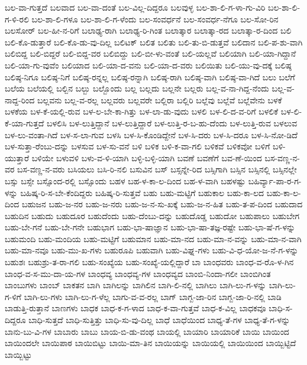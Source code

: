 {ಬಲ-ವಾ-ಗುತ್ತದೆ
ಬಲವಾದ
ಬಲ-ವಾ-ದಂತೆ
ಬಲ-ವಿಲ್ಲ-ದಿದ್ದರೂ
ಬಲವುಳ್ಳ
ಬಲ-ಶಾ-ಲಿ-ಗ-ಳಾ-ಗು-ವಿರಿ
ಬಲ-ಶಾ-ಲಿ-ಗ-ಳಿ-ರಲಿ
ಬಲ-ಶಾ-ಲಿ-ಗಳೂ
ಬಲ-ಶಾ-ಲಿ-ಗ-ಳೆಂದು
ಬಲ-ಸಂವರ್ಧನೆ
ಬಲ-ಸಂವರ್ಧ-ನೆಗೂ
ಬಲ-ಸೋ-ರಿನ
ಬಲಸೋರ್
ಬಲ-ಹೀ-ನ-ರಿಗೆ
ಬಲಾಢ್ಯ-ರಾಗಿ
ಬಲಾಢ್ಯ-ರಿ-ಗಿಂತ
ಬಲಾತ್ಕಾರ
ಬಲಾತ್ಕಾ-ರದ
ಬಲಾತ್ಕಾ-ರ-ದಿಂದ
ಬಲಿ
ಬಲಿ-ಕೊ-ಡುತ್ತಾರೆ
ಬಲಿ-ಕೊ-ಡು-ವು-ದಿಲ್ಲ
ಬಲಿಟಕ್
ಬಲಿತ
ಬಲಿತು
ಬಲಿ-ತು-ಬಿ-ಡುತ್ತವೆ
ಬಲಿದಾನ
ಬಲಿ-ಪ-ಶು-ವಾಗಿ
ಬಲಿಬಿದ್ದ
ಬಲಿ-ಬಿದ್ದರೆ
ಬಲಿ-ಬಿದ್ದ-ವರ
ಬಲಿಬಿದ್ದು
ಬಲಿ-ಬೀ-ಳು-ವಂತೆ
ಬಲಿ-ಯಲ್ಲವೆ
ಬಲಿಯಾಗಿ
ಬಲಿ-ಯಾ-ಗಿದ್ದಾನೆ
ಬಲಿ-ಯಾ-ಗು-ವುವೆಂ
ಬಲಿಯಾದ
ಬಲಿ-ಯಾ-ದ-ವನು
ಬಲಿ-ಯಾ-ದ-ವರು
ಬಲಿಯಿತು
ಬಲಿ-ಯು-ವು-ದಕ್ಕೆ
ಬಲಿಷ್ಠ
ಬಲಿಷ್ಠ-ನಿಗೂ
ಬಲಿಷ್ಠ-ನಿಗೆ
ಬಲಿಷ್ಠ-ರನ್ನಲ್ಲ
ಬಲಿಷ್ಠ-ರನ್ನಾಗಿ
ಬಲಿಷ್ಠ-ರಾಗಿ
ಬಲಿಷ್ಠ-ವಾಗಿ
ಬಲಿಷ್ಠ-ವಾ-ಗಿದೆ
ಬಲು
ಬಲೆಗೆ
ಬಲೆಯ
ಬಲೆಯಲ್ಲಿ
ಬಲ್ಬಿನ
ಬಲ್ಬು
ಬಲ್ಬೊಂದು
ಬಲ್ಲ
ಬಲ್ಲದು
ಬಲ್ಲನೇ
ಬಲ್ಲರು
ಬಲ್ಲ-ವ-ನಾ-ಗಿದ್ದ-ನೆಂದು
ಬಲ್ಲ-ವ-ನಾದ್ದ-ರಿಂದ
ಬಲ್ಲವನು
ಬಲ್ಲ-ವ-ರಲ್ಲ
ಬಲ್ಲವರು
ಬಲ್ಲವರೇ
ಬಲ್ಲಿರಾ
ಬಲ್ಲಿರಿ
ಬಲ್ಲೆವು
ಬಲ್ಲೆವೆ
ಬಲ್ಲೆವೇನು
ಬಳಕೆ
ಬಳಕೆಯ
ಬಳ-ಕೆ-ಯಲ್ಲಿ-ರುವ
ಬಳ-ಲ-ಬೇ-ಕಾ-ಗಿತ್ತು
ಬಳ-ಲಾ-ಡು-ವುದು
ಬಳಲಿ
ಬಳ-ಲಿ-ದ-ವ-ರಿಗೆ
ಬಳಲಿಕೆ
ಬಳ-ಲಿ-ಕೆ-ಯಾ-ಗುತ್ತದೆ
ಬಳಲಿಸಿ
ಬಳ-ಲುತ್ತಿದ್ದಾನೆ
ಬಳ-ಲುತ್ತಿದ್ದಾರೆ
ಬಳ-ಲುತ್ತಿ-ರ-ಬ-ಹು-ದೆಂದು
ಬಳ-ಲುತ್ತಿ-ರುವ
ಬಳಲುವ
ಬಳ-ಲು-ವಂತಾ-ಗಿದೆ
ಬಳ-ಸ-ಲಾ-ಗುವ
ಬಳಸಿ
ಬಳ-ಸಿ-ಕೊಂಡಿದ್ದೇನೆ
ಬಳ-ಸಿ-ದರು
ಬಳ-ಸಿ-ದರೂ
ಬಳ-ಸಿ-ನೋ-ಡಿದೆ
ಬಳ-ಸುತ್ತಾ-ರೆಂಬು-ದನ್ನು
ಬಳಸುವ
ಬಳ-ಸು-ವನೆ
ಬಳಿ
ಬಳಿಕ
ಬಳಿ-ಕ-ವಾ-ಗಲಿ
ಬಳಿಕವೆ
ಬಳಿಕವೋ
ಬಳಿಗೆ
ಬಳಿ-ಯುತ್ತಾರೆ
ಬಳಿಯೇ
ಬಳುವಳಿ
ಬಳು-ವ-ಳಿ-ಯಾಗಿ
ಬಳ್ಳಿ-ಬಳ್ಳಿ-ಯಾಗಿ
ಬವಣೆ
ಬವಣೆಗೆ
ಬವ-ಣೆ-ಯಿಂದ
ಬಸ-ವಣ್ಣ-ನ-ವರ
ಬಸ-ವಣ್ಣ-ನ-ವರು
ಬಸಿಯಲು
ಬಸಿ-ರಿ-ನಲಿ
ಬಸುವಿನ
ಬಸ್
ಬಸ್ಸನ್ನೇ-ರಿದ
ಬಸ್ಸಿಗಾಗಿ
ಬಸ್ಸಿನ
ಬಸ್ಸಿನಲ್ಲಿ
ಬಸ್ಸಿನಲ್ಲೇ
ಬಸ್ಸು
ಬಸ್ಸೇ
ಬಸ್ಸೊಂದ-ರಲ್ಲಿ
ಬಸ್ಸೊಂದು
ಬಹಳ
ಬಹ-ಳ-ಕಾ-ಲ-ದಿಂದ
ಬಹ-ಳ-ವಾಗಿ
ಬಹಳಷ್ಟು
ಬಹಿರ್ವ್ಯಾ-ಪಾ-ರ-ಗ-ಳನ್ನು
ಬಹಿಷ್ಕ-ರಿ-ಸ-ಬೇ-ಕೆಂದಿದ್ದರು
ಬಹಿಷ್ಕ-ರಿ-ಸುತ್ತವೆ
ಬಹು
ಬಹು-ಮಟ್ಟಿಗೆ
ಬಹುಕಾಲ
ಬಹು-ಕಾ-ಲದ
ಬಹು-ಕಾ-ಲ-ದಿಂದ
ಬಹುಜನ
ಬಹು-ಜ-ನರ
ಬಹು-ಜ-ನರು
ಬಹು-ಜ-ನ-ಸು-ಖಕ್ಕೆ
ಬಹು-ಜ-ನ-ಹಿತ
ಬಹು-ತ-ಪ-ದಿಂದ
ಬಹುದಾದ
ಬಹುದಿನ
ಬಹುದು
ಬಹುದೂರ
ಬಹುದೆಂದು
ಬಹು-ದೆಂಬು-ದನ್ನು
ಬಹುದೊಡ್ಡ
ಬಹುದೋ
ಬಹುಪಾಲು
ಬಹುಬೇಗ
ಬಹು-ಬೇ-ಗನೆ
ಬಹು-ಬೇ-ಗನೇ
ಬಹುಭಾಗ
ಬಹು-ಭಾ-ಷಾಜ್ಞಾನ
ಬಹು-ಭಾ-ಷಾ-ತಜ್ಞ-ರಷ್ಟೇ
ಬಹು-ಭಾ-ಷೆ-ಗ-ಳನ್ನು
ಬಹುಮಂದಿ
ಬಹು-ಮಂದಿಯ
ಬಹು-ಮಟ್ಟಿಗೆ
ಬಹುಮಾನ
ಬಹು-ಮಾ-ನದ
ಬಹು-ಮಾ-ನ-ವನ್ನು
ಬಹು-ಮಾ-ನ-ವಾಗಿ
ಬಹು-ಮಾ-ನವೂ
ಬಹು-ಮು-ಖ-ಗಳು
ಬಹುರೂಪಿ
ಬಹುವಾಗಿ
ಬಹು-ವಿಘ್ನ-ಗಳು
ಬಹು-ವಿ-ಧ-ಯೋ-ಜ-ನೆ-ಗ-ಳನ್ನು
ಬಹುಶಃ
ಬಹುಶ್ರು-ತ-ರಾ-ಗಲಿ
ಬಹು-ಸಂಖ್ಯೆಯ
ಬಹು-ಸಂಖ್ಯೆ-ಯಲ್ಲಿದ್ದಾರೆ
ಬಾ
ಬಾಂಧವರು
ಬಾಂಧ-ವ-ರೊ-ಳ-ಗಿನ
ಬಾಂಧ-ವ-ಸ-ಮು-ದಾ-ಯ-ಗಳ
ಬಾಂಧವ್ಯ
ಬಾಂಧವ್ಯ-ಗಳ
ಬಾಂಧವ್ಯದ
ಬಾಂಬಿ-ನಿಂದಾ-ಗಲೀ
ಬಾಂಬಿಗಿಂತ
ಬಾಂಬುಗಳು
ಬಾಂಬ್
ಬಾಕತನ
ಬಾಗಿ
ಬಾಗಿಲನ್ನು
ಬಾಗಿಲಿನ
ಬಾಗಿ-ಲಿ-ನಲ್ಲಿ
ಬಾಗಿಲು
ಬಾಗಿ-ಲು-ಗ-ಳನ್ನು
ಬಾಗಿ-ಲು-ಗ-ಳಿಗೆ
ಬಾಗಿ-ಲು-ಗಳು
ಬಾಗಿ-ಲು-ಗ-ಳೆಲ್ಲ
ಬಾಗು-ವ-ವ-ರಲ್ಲ
ಬಾಗ್
ಬಾಗ್ಬ-ಜಾ-ರಿನ
ಬಾಗ್ಬ-ಜಾ-ರಿ-ನಲ್ಲಿ
ಬಾಡಿ
ಬಾಡುತ್ತಿ-ರುತ್ತಾನೆ
ಬಾಣಗಳು
ಬಾಧಕ
ಬಾಧ-ಕ-ಗ-ಳಾದ
ಬಾಧ-ಕ-ವಾ-ಗುತ್ತವೆ
ಬಾಧ-ಕ-ವಿಲ್ಲ
ಬಾಧಕವೂ
ಬಾಧಿ-ಸ-ದಿದ್ದರೂ
ಬಾಧಿ-ಸುತ್ತದೆ
ಬಾಧಿ-ಸುತ್ತಿತ್ತು
ಬಾಧಿ-ಸು-ವು-ದಿಲ್ಲ
ಬಾಧೆ
ಬಾಧೆಯಿಂದ
ಬಾಧ್ಯ-ತೆ-ಗಳ
ಬಾಧ್ಯ-ತೆ-ಗ-ಳನ್ನು
ಬಾನು-ಬು-ವಿ-ಗಳ
ಬಾಬಾರು
ಬಾಬು
ಬಾಯ-ಬಿ-ಡು-ವಂಥ
ಬಾಯಲ್ಲಿ
ಬಾಯಾರಿ
ಬಾಯಾರಿಕೆ
ಬಾಯಿ
ಬಾಯಿಂದ
ಬಾಯಿಂದಲೇ
ಬಾಯಿಪಾಠ
ಬಾಯಿಬಿಟ್ಟು
ಬಾಯಿ-ಮಾ-ತಿನ
ಬಾಯಿಯನ್ನು
ಬಾಯಿಯಲ್ಲಿ
ಬಾಯಿಯಿಂದ
ಬಾಯ್ಬಿಟ್ಟಿದೆ
ಬಾಯ್ಬಿಟ್ಟು
}
